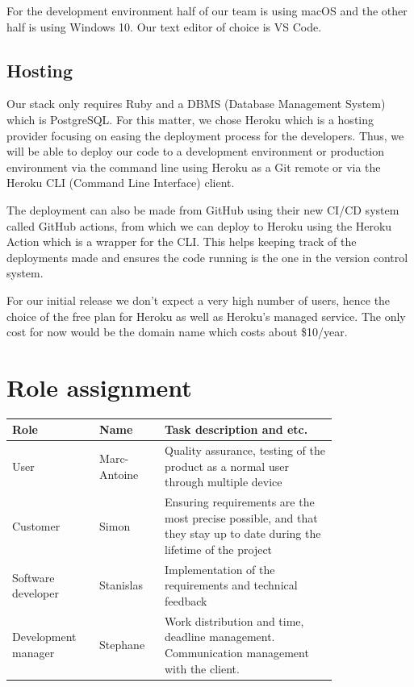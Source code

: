 \documentclass[conference]{IEEEtran}
\begin{document}
For the development environment half of our team is using macOS and the other half is using Windows 10. 
Our text editor of choice is VS Code.

\subsection{Hosting}

Our stack only requires Ruby and a DBMS (Database Management System) which is PostgreSQL. 
For this matter, we chose Heroku which is a hosting provider focusing on easing the deployment process for the developers. 
Thus, we will be able to deploy our code to a development environment or production environment via the command line using Heroku as a Git remote or via the Heroku CLI (Command Line Interface) client.

The deployment can also be made from GitHub using their new CI/CD system called GitHub actions, from which we can deploy to Heroku using the Heroku Action which is a wrapper for the CLI. 
This helps keeping track of the deployments made and ensures the code running is the one in the version control system.

For our initial release we don't expect a very high number of users, hence the choice of the free plan for Heroku as well as Heroku's managed service. 
The only cost for now would be the domain name which costs about \$10/year.


\section{Role assignment}

\begin{tabular}{ |p{0.2\linewidth}|p{0.15\linewidth}|p{0.45\linewidth}| }
\hline
Role & Name & Task description and etc. \\
\hline
User & Marc-Antoine & Quality assurance, testing of the product as a normal user through multiple device \\
\hline
Customer & Simon & Ensuring requirements are the most precise possible, and that they stay up to date during the lifetime of the project \\
\hline
Software developer & Stanislas & Implementation of the requirements and technical feedback \\
\hline
Development manager & Stephane & Work distribution and time, deadline management. Communication management with the client. \\
\hline
\end{tabular}
\end{document}

